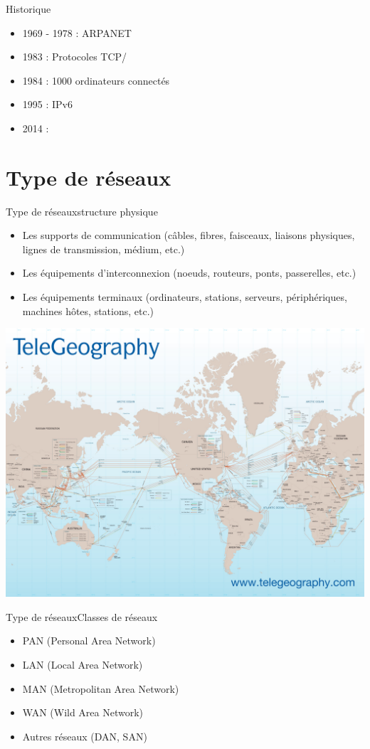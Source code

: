 \documentclass{beamer}
\begin{document}
	\begin{frame}{Historique}
		\begin{itemize}[<+->]
			\item 1969 - 1978 : ARPANET
			\item 1983 : Protocoles TCP/
			\item 1984 : 1000 ordinateurs connectés
			\item 1995 : IPv6
			\item 2014 :
 		\end{itemize}
	\end{frame}

	\section{Type de réseaux}

	\begin{frame}{Type de réseaux}{structure physique}
		\begin{itemize}
			\item Les supports de communication (câbles, fibres, faisceaux, liaisons physiques, lignes de transmission, médium, etc.)
			\item Les équipements d’interconnexion (noeuds, routeurs, ponts, passerelles, etc.)
			\item Les équipements terminaux (ordinateurs, stations, serveurs, périphériques, machines hôtes, stations, etc.)
		\end{itemize}
	\end{frame}
	
	\begin{frame}
		\begin{center}
			\includegraphics[scale=0.35]{Carte.jpg}
		\end{center}
	\end{frame}

	\begin{frame}{Type de réseaux}{Classes de réseaux}
		\begin{itemize}
			\item PAN (Personal Area Network)
			\item LAN (Local Area Network)
			\item MAN (Metropolitan Area Network)
			\item WAN (Wild Area Network)
			\item Autres réseaux (DAN, SAN)
		\end{itemize}
	\end{frame}
\end{document}
